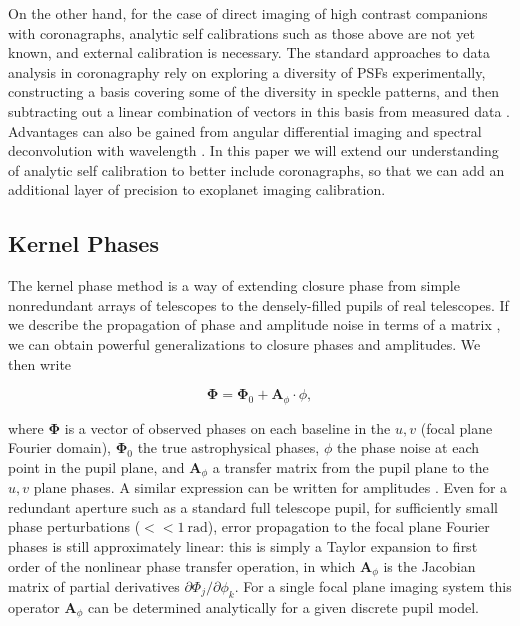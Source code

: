 \documentclass[modern]{aastex63}
\begin{document}
On the other hand, for the case of direct imaging of high contrast companions with coronagraphs, analytic self calibrations such as those above are not yet known, and external calibration is necessary. The standard approaches to data analysis in coronagraphy rely on exploring a diversity of PSFs experimentally, constructing a basis covering some of the diversity in speckle patterns, and then subtracting out a linear combination of vectors in this basis from measured data \citep[e.g.][]{lafreniere07,soummer12,pueyo16}. Advantages can also be gained from angular differential imaging \citep[ADI;][]{marois06} and spectral deconvolution with wavelength \citep{sparks02}. In this paper we will extend our understanding of analytic self calibration to better include coronagraphs, so that we can add an additional layer of precision to exoplanet imaging calibration.

\subsection{Kernel Phases}

The kernel phase method is a way of extending closure phase from simple nonredundant arrays of telescopes to the densely-filled pupils of real telescopes. If we describe the propagation of phase and amplitude noise in terms of a matrix \citep{lannes1991}, we can obtain powerful generalizations to closure phases and amplitudes. We then write

\begin{equation}
    \mathbf{\Phi} = \mathbf{\Phi}_0 + \mathbf{A}_\phi \cdot \phi,
\end{equation}

\noindent where $\mathbf{\Phi}$ is a vector of observed phases on each baseline in the $u,v$ (focal plane Fourier domain), $\mathbf{\Phi}_0$ the true astrophysical phases, $\phi$ the phase noise at each point in the pupil plane, and $\mathbf{A}_\phi$ a transfer matrix from the pupil plane to the $u,v$ plane phases. A similar expression can be written for amplitudes \citep{pope16}.  Even for a redundant aperture such as a standard full telescope pupil, for sufficiently small phase perturbations ($<< 1~\text{rad}$), error propagation to the focal plane Fourier phases is still approximately linear: this is simply a Taylor expansion to first order of the nonlinear phase transfer operation, in which $\mathbf{A}_\phi$ is the Jacobian matrix of partial derivatives $\partial\Phi_j/\partial\phi_k$. For a single focal plane imaging system this operator $\mathbf{A}_\phi$ can be determined analytically for a given discrete pupil model. 
\end{document}

